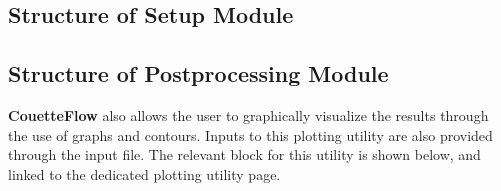 \documentclass[letterpaper,10pt,english]{sphinxmanual}
\begin{document}
\subsection{Structure of Setup Module}
\label{\detokenize{inputfile:str-setup}}\label{\detokenize{inputfile:structure-of-setup-module}}
\begin{sphinxVerbatim}[commandchars=\\\{\}]
\end{sphinxVerbatim}


\subsection{Structure of Postprocessing Module}
\label{\detokenize{inputfile:str-post}}\label{\detokenize{inputfile:structure-of-postprocessing-module}}\label{\detokenize{inputfile:plot-input}}
{\color{red}\bfseries{}\textbar{}CouetteFlow\textbar{}} also allows the user to graphically visualize the results through the use of graphs and contours. Inputs to this plotting utility are also provided through the input file. The relevant block for this utility is shown below, and linked to the dedicated plotting utility page.
\end{document}
